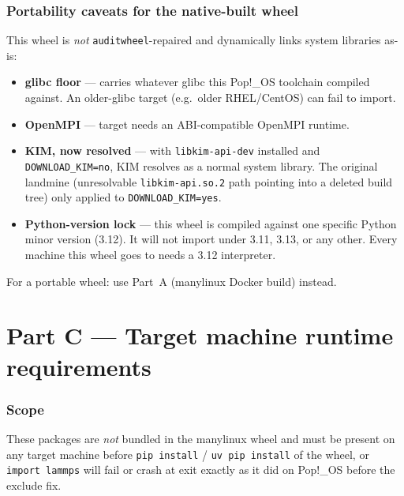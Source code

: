 \documentclass[11pt]{article}
\begin{document}
\section{Portability caveats for the native-built wheel}
\label{sec:portability-apt}

This wheel is \emph{not} \texttt{auditwheel}-repaired and dynamically links
system libraries as-is:
\begin{itemize}
  \item \textbf{glibc floor} --- carries whatever glibc this Pop!\_OS toolchain
    compiled against.  An older-glibc target (e.g.\ older RHEL/CentOS) can
    fail to import.
  \item \textbf{OpenMPI} --- target needs an ABI-compatible OpenMPI runtime.
  \item \textbf{KIM, now resolved} --- with \texttt{libkim-api-dev} installed
    and \texttt{DOWNLOAD\_KIM=no}, KIM resolves as a normal system library.
    The original landmine (unresolvable \texttt{libkim-api.so.2} path pointing
    into a deleted build tree) only applied to \texttt{DOWNLOAD\_KIM=yes}.
  \item \textbf{Python-version lock} --- this wheel is compiled against one
    specific Python minor version (3.12).  It will not import under 3.11, 3.13,
    or any other.  Every machine this wheel goes to needs a 3.12 interpreter.
\end{itemize}

For a portable wheel: use Part~A (manylinux Docker build) instead.


\newpage
\part{Part C --- Target machine runtime requirements}

\section*{Scope}

These packages are \emph{not} bundled in the manylinux wheel and must be
present on any target machine before \texttt{pip install} / \texttt{uv pip
install} of the wheel, or \texttt{import lammps} will fail or crash at exit
exactly as it did on Pop!\_OS before the exclude fix.
\end{document}
